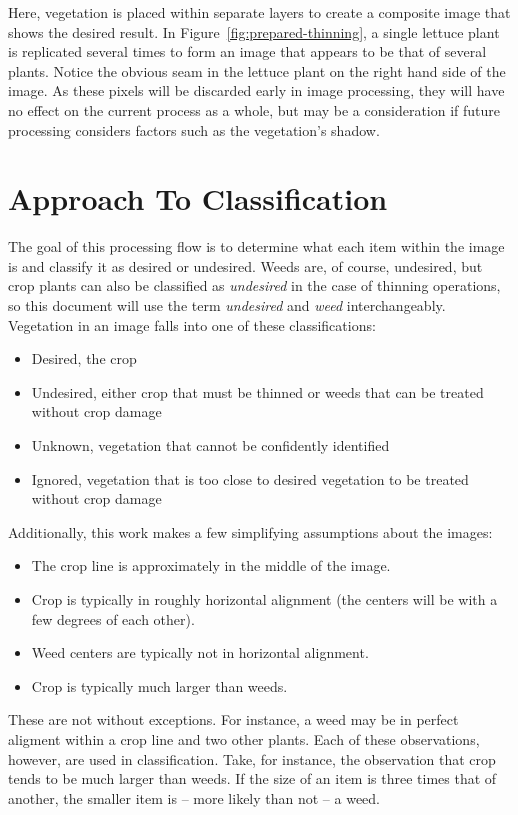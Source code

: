 \documentclass[letterpaper]{article}
\begin{document}
Here, vegetation is placed within separate layers to create a composite image that shows the desired result. In Figure~\ref{fig:prepared-thinning}, a single lettuce plant is replicated several times to form an image that appears to be that of several plants. Notice the obvious seam in the lettuce plant on the right hand side of the image. As these pixels will be discarded early in image processing, they will have no effect on the current process as a whole, but may be a consideration if future processing considers factors such as the vegetation’s shadow.



\section{Approach To Classification}
The goal of this processing flow is to determine what each item within the image is and classify it as desired or undesired. Weeds are, of course, undesired, but crop plants can also be classified as \textit{undesired} in the case of thinning operations, so this document will use the term \textit{undesired} and \textit{weed} interchangeably. Vegetation in an image falls into one of these classifications:
\begin{itemize}
	\item{Desired, the crop}
	\item{Undesired, either crop that must be thinned or weeds that can be treated without crop damage}
	\item{Unknown, vegetation that cannot be confidently identified}
	\item{Ignored, vegetation that is too close to desired vegetation to be treated without crop damage}
\end{itemize}

Additionally, this work makes a few simplifying assumptions about the images:
\begin{itemize}
	\item{The crop line is approximately in the middle of the image.}
	\item{Crop is typically in roughly horizontal alignment (the centers will be with a few degrees of each other).}
	\item{Weed centers are typically not in horizontal alignment.}
	\item{Crop is typically much larger than weeds.}
\end{itemize}

These are not without exceptions. For instance, a weed may be in perfect aligment within a crop line and two other plants. Each of these observations, however, are used in classification. Take, for instance, the observation that crop tends to be much larger than weeds. If the size of an item is three times that of another, the smaller item is -- more likely than not -- a weed.
\end{document}
